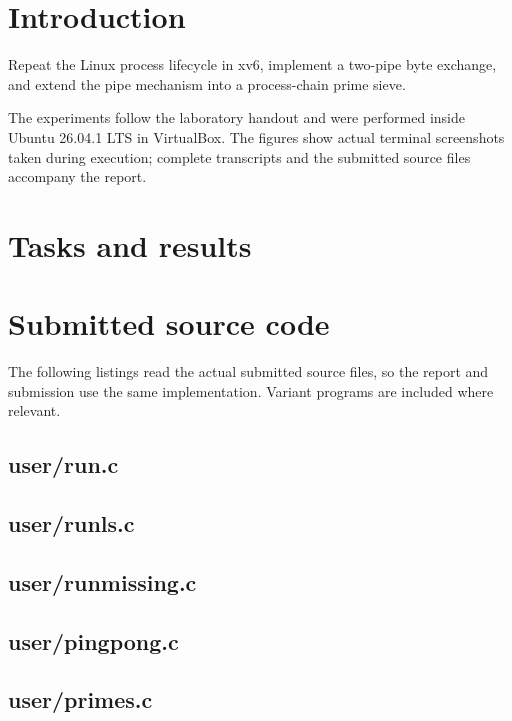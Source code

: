 \documentclass{tum_report}
\begin{document}

\tableofcontents
\thispagestyle{empty}
\clearpage
\chapter{Introduction}
Repeat the Linux process lifecycle in xv6, implement a two-pipe byte exchange, and extend the pipe mechanism into a process-chain prime sieve.

The experiments follow the laboratory handout and were performed inside Ubuntu 26.04.1 LTS in VirtualBox. The figures show actual terminal screenshots taken during execution; complete transcripts and the submitted source files accompany the report.
\chapter{Tasks and results}

\clearpage

\par\vspace{0.8cm}

\clearpage
\appendix
\chapter{Submitted source code}
The following listings read the actual submitted source files, so the report and submission use the same implementation. Variant programs are included where relevant.
\Needspace{329pt}
\section{user/run.c}

\Needspace{329pt}
\section{user/runls.c}

\Needspace{329pt}
\section{user/runmissing.c}

\Needspace{582pt}
\section{user/pingpong.c}

\Needspace{615pt}
\section{user/primes.c}

\end{document}

